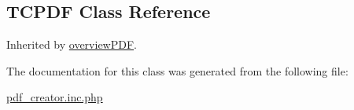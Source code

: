 \hypertarget{class_t_c_p_d_f}{\subsection{T\+C\+P\+D\+F Class Reference}
\label{class_t_c_p_d_f}
}


Inherited by \hyperlink{classoverview_p_d_f}{overview\+P\+D\+F}.



The documentation for this class was generated from the following file\+:\begin{DoxyCompactItemize}
\item 
\hyperlink{pdf__creator_8inc_8php}{pdf\+\_\+creator.\+inc.\+php}\end{DoxyCompactItemize}
